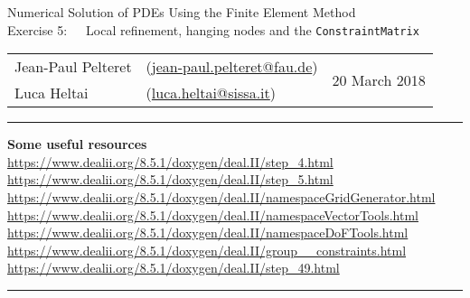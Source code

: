 \documentclass[11pt]{exam}
\makeatletter
\newcommand{\makeheader}[3]{%
\setcounter{question}{0}
\begin{center}
{\sc Numerical Solution of PDEs Using the Finite Element Method}\vspace{2ex}\\
{\sc Exercise #1:\ \ \ #2}\vspace{2ex}\\
\begin{tabular*}{\textwidth}{ll @{\extracolsep{\fill}}r}
Jean-Paul Pelteret & (\url{jean-paul.pelteret@fau.de}) & \multirow{2}{*}{#3} \\
Luca Heltai & (\url{luca.heltai@sissa.it}) & \\
\end{tabular*}
\end{center}
}
\newcommand{\makeresources}[1]{%
\rule{\textwidth}{0.6mm}
\textbf{Some useful resources}\\[1.5ex]
#1 \par
\rule{\textwidth}{0.6mm}
}
\makeatother
\begin{document}
\begin{questions}
\end{questions}




\clearpage
\makeheader{5}{Local refinement, hanging nodes and the \texttt{ConstraintMatrix}}{20 March 2018}
\makeresources{%
\url{https://www.dealii.org/8.5.1/doxygen/deal.II/step_4.html} \\
\url{https://www.dealii.org/8.5.1/doxygen/deal.II/step_5.html} \\
\url{https://www.dealii.org/8.5.1/doxygen/deal.II/namespaceGridGenerator.html} \\
\url{https://www.dealii.org/8.5.1/doxygen/deal.II/namespaceVectorTools.html} \\
\url{https://www.dealii.org/8.5.1/doxygen/deal.II/namespaceDoFTools.html} \\
\url{https://www.dealii.org/8.5.1/doxygen/deal.II/group__constraints.html} \\
\url{https://www.dealii.org/8.5.1/doxygen/deal.II/step_49.html}
}
\end{document}
